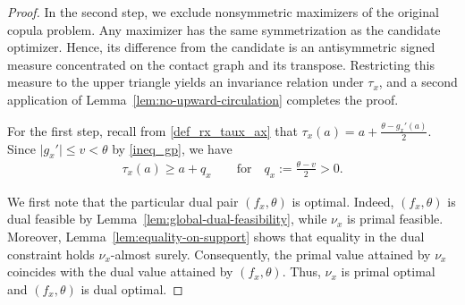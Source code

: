 \documentclass{article}
\begin{document}
\begin{proof}
In the second step, we exclude nonsymmetric maximizers of the original copula problem.
Any maximizer has the same symmetrization as the candidate optimizer.
Hence, its difference from the candidate is an antisymmetric signed measure concentrated on the contact graph and its transpose.
Restricting this measure to the upper triangle yields an invariance relation under \(\tau_x\), and a second application of Lemma~\ref{lem:no-upward-circulation} completes the proof.

For the first step, recall from \eqref{def_rx_taux_ax} that \(\tau_x(a) = a+\frac{\theta-g_x'(a)}{2}. \) Since \(\lvert g_x'\rvert\leq v<\theta\) by \eqref{ineq_gp}, we have
\begin{align}\label{eq:tau-positive-shift}
    \tau_x(a)
    \geq
    a+q_x \qquad \text{for}
    \quad
    q_x:=\frac{\theta-v}{2}>0.
\end{align}

We first note that the particular dual pair \((f_x,\theta)\) is optimal.
Indeed, \((f_x,\theta)\) is dual feasible by Lemma~\ref{lem:global-dual-feasibility}, while \(\nu_x\) is primal feasible.
Moreover, Lemma~\ref{lem:equality-on-support} shows that equality in the dual constraint holds \(\nu_x\)-almost surely.
Consequently, the primal value attained by \(\nu_x\) coincides with the dual value attained by \((f_x,\theta)\).
Thus, \(\nu_x\) is primal optimal and \((f_x,\theta)\) is dual optimal.


\end{proof}
\end{document}
